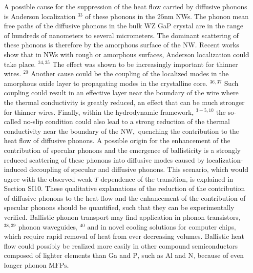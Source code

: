 \documentclass[a4paper, 12pt]{article}%
\begin{document}
A possible cause for the suppression of the heat flow carried by diffusive phonons is Anderson localization ${ }^{33}$ of these phonons in the $25 \mathrm{nm}$ NWs. The phonon mean free paths of the diffusive phonons in the bulk WZ GaP crystal are in the range of hundreds of nanometers to several micrometers. The dominant scattering of these phonons is therefore by the amorphous surface of the NW. Recent works show that in NWs with rough or amorphous surfaces, Anderson localization could take place. ${ }^{34,35}$ The effect was shown to be increasingly important for thinner wires. ${ }^{20}$ Another cause could be the coupling of the localized modes in the amorphous oxide layer to propagating modes in the crystalline core. ${ }^{36,37}$ Such coupling could result in an effective layer near the boundary of the wire where the thermal conductivity is greatly reduced, an effect that can be much stronger for thinner wires. Finally, within the hydrodynamic framework, ${ }^{3-5,10}$ the so-called no-slip condition could also lead to a strong reduction of the thermal conductivity near the boundary of the $\mathrm{NW},$ quenching the contribution to the heat flow of diffusive phonons. A possible origin for the enhancement of the contribution of specular phonons and the emergence of ballisticity is a strongly reduced scattering of these phonons into diffusive modes caused by localization-induced decoupling of specular and diffusive phonons. This scenario, which would agree with the observed weak $T$ dependence of the transition, is explained in Section SI10.
These qualitative explanations of the reduction of the contribution of diffusive phonons to the heat flow and the enhancement of the contribution of specular phonons should be quantified, such that they can be experimentally verified. Ballistic phonon transport may find application in phonon transistors, ${ }^{38,39}$ phonon waveguides, ${ }^{40}$ and in novel cooling solutions for computer chips, which require rapid removal of heat from ever decreasing volumes. Ballistic heat flow could possibly be realized more easily in other compound semiconductors composed of lighter elements than Ga and $\mathrm{P}$, such as $\mathrm{Al}$ and $\mathrm{N}$, because of even longer phonon $\mathrm{MFPs}$. 
\end{document}
